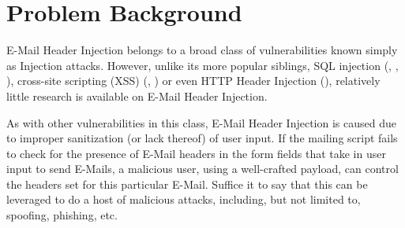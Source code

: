 \section{Problem Background}

E-Mail Header Injection belongs to a broad class of vulnerabilities known simply as Injection attacks. However, unlike its more popular siblings, SQL injection (\cite{sql1}, \cite{sql0}, \cite{sql2}), cross-site scripting (XSS) (\cite{Injection1}, \cite{KleinAmit}) or even HTTP Header Injection (\cite{sessionride}), relatively little research is available on E-Mail Header Injection.

As with other vulnerabilities in this class, E-Mail Header Injection is caused due to improper sanitization (or lack thereof) of user input. If the mailing script fails to check for the presence of E-Mail headers in the form fields that take in user input to send E-Mails, a malicious user, using a well-crafted payload, can control the headers set for this particular E-Mail. Suffice it to say that this can be leveraged to do a host of malicious attacks, including, but not limited to, spoofing, phishing, etc.